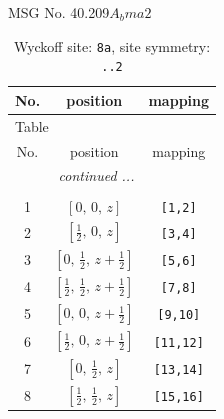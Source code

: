 \documentclass[fleqn,8pt]{jsarticle}
\begin{document}
\setcounter{MaxMatrixCols}{32}

\renewcommand{\tablename}{Table~}
\renewcommand{\figurename}{Figure~}
\begin{center}
\LARGE
MSG No. 40.209\quad$A_{b}ma2$
\end{center}
\renewcommand{\arraystretch}{1.2}
\begin{longtable}{ccc}
\caption{Wyckoff site: {\tt 8a}, site symmetry: {\tt ..2}}
 \\
 \hline \hline
No. & position & mapping \\ \hline \endfirsthead

\multicolumn{2}{l}{\tablename\ \thetable{}} \\
 \hline \hline
No. & position & mapping \\ \hline \endhead

 \hline \hline
\multicolumn{2}{r}{\footnotesize\it continued ...} \\ \endfoot

 \hline \hline
\multicolumn{2}{r}{} \\ \endlastfoot

1 & $\left[ 0,\, 0,\, z \right]$ & {\tt [1,2]} \\ \hline
2 & $\left[ \frac{1}{2},\, 0,\, z \right]$ & {\tt [3,4]} \\ \hline
3 & $\left[ 0,\, \frac{1}{2},\, z + \frac{1}{2} \right]$ & {\tt [5,6]} \\ \hline
4 & $\left[ \frac{1}{2},\, \frac{1}{2},\, z + \frac{1}{2} \right]$ & {\tt [7,8]} \\ \hline
5 & $\left[ 0,\, 0,\, z + \frac{1}{2} \right]$ & {\tt [9,10]} \\ \hline
6 & $\left[ \frac{1}{2},\, 0,\, z + \frac{1}{2} \right]$ & {\tt [11,12]} \\ \hline
7 & $\left[ 0,\, \frac{1}{2},\, z \right]$ & {\tt [13,14]} \\ \hline
8 & $\left[ \frac{1}{2},\, \frac{1}{2},\, z \right]$ & {\tt [15,16]} \\
\end{longtable}
\renewcommand{\arraystretch}{1.2}
\end{document}

